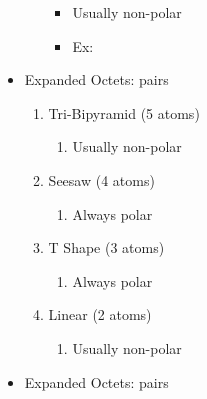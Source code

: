 \documentclass[12pt]{article}
\begin{document}
\begin{itemize}
\begin{enumerate}
\begin{itemize}
          \item Usually non-polar

          \item Ex:


        \end{itemize}

    \end{enumerate}

  \item Expanded Octets:  pairs

    \begin{enumerate}

      \item Tri-Bipyramid (5 atoms)

        \begin{enumerate}

          \item Usually non-polar

        \end{enumerate}

      \item Seesaw (4 atoms) 

        \begin{enumerate}

          \item Always polar

        \end{enumerate}

      \item T Shape (3 atoms)

        \begin{enumerate}

          \item Always polar

        \end{enumerate}

      \item Linear (2 atoms)

        \begin{enumerate}

          \item Usually non-polar

        \end{enumerate}

    \end{enumerate}

  \item Expanded Octets:  pairs


\end{itemize}
\end{document}

